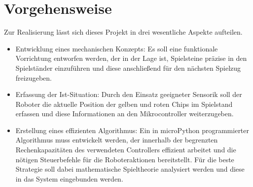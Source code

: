 \section{Vorgehensweise}
Zur Realisierung lässt sich dieses Projekt in drei wesentliche Aspekte aufteilen.
\begin{itemize}
\item Entwicklung eines mechanischen Konzepts: Es soll eine funktionale Vorrichtung entworfen werden, der in der Lage ist, Spielsteine präzise in den Spielständer einzuführen und diese anschließend für den nächsten Spielzug freizugeben.
\item Erfassung der Ist-Situation: Durch den Einsatz geeigneter Sensorik soll der Roboter die aktuelle Position der gelben und roten Chips im Spielstand erfassen und diese Informationen an den Mikrocontroller weiterzugeben.
\item Erstellung eines effizienten Algorithmus: Ein in microPython programmierter Algorithmus muss entwickelt werden, der innerhalb der begrenzten Rechenkapazitäten des verwendeten Controllers effizient arbeitet und die nötigen Steuerbefehle für die Roboteraktionen bereitstellt. Für die beste Strategie soll dabei mathematische Spieltheorie analysiert werden und diese in das System eingebunden werden.
\end{itemize}

